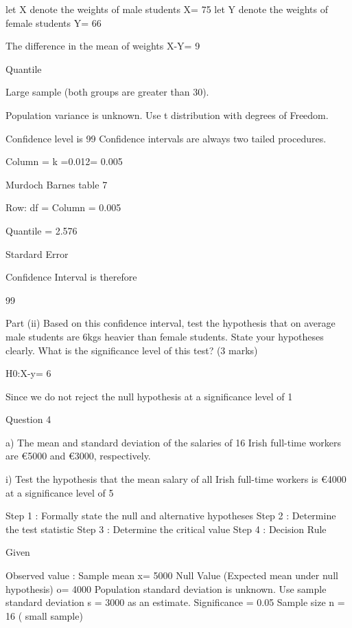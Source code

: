 \documentclass[12pt]{report}
\begin{document}
let X denote the weights of male students    X= 75
let Y denote the weights of female students  Y= 66

The difference in the mean of weights X-Y= 9

Quantile

Large sample (both groups are greater than 30).

Population variance is unknown.
Use t distribution with  degrees of Freedom.


Confidence level is 99%
Confidence intervals are always two tailed procedures.


Column = k =0.012= 0.005


Murdoch Barnes table 7


Row: df =  
Column = 0.005

Quantile =  2.576 


Stardard Error






Confidence Interval is therefore

99%


Part (ii)
Based on this confidence interval, test the hypothesis that on average male students are 6kgs heavier than female students.
State your hypotheses clearly. What is the significance level of this test?   (3 marks)

H0:X-y= 6




Since  we do not reject the null hypothesis at a significance level of 1%






Question 4

a) The mean and standard deviation of the salaries of 16 Irish full-time workers are €5000  and €3000, respectively.

i)  Test the hypothesis that the mean salary of all Irish full-time workers is €4000 at a significance level of 5%



Step 1 : Formally state the null and alternative hypotheses
Step 2 : Determine the test statistic
Step 3 : Determine the critical value
Step 4 : Decision Rule



Given

Observed value : Sample mean     x= 5000 
Null Value (Expected mean under null hypothesis)     o= 4000   
Population standard deviation is unknown.
Use sample standard deviation s = 3000 as an estimate.
Significance  = 0.05
Sample size n = 16  ( small sample)
\end{document}
